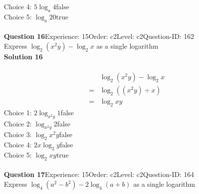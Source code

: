 \documentclass{article}
\begin{document}
Choice 4: \hspace{20pt}$5\log_{a}4$\hspace{20pt}false\\
Choice 5: \hspace{20pt}$\log_{a}20$\hspace{20pt}true\\
\\[4pt]
\noindent\textbf{Question 16}\hspace{20pt}Experience: 15\hspace{20pt}Order: c2\hspace{20pt}Level: c2\hspace{20pt}Question-ID: 162\\[2pt]
Express $\log_{2}(x^2y)-\log_{2}x$ as a single logarithm\\[4pt]
\noindent\textbf{Solution 16}\\[2pt]
\\[-35pt]\begin{align*}
&\log_{2}(x^2y)-\log_{2}x\\[2pt]
=&\log_{2}((x^2y) \div x)\\[2pt]
=&\log_{2}xy
\end{align*}
Choice 1: \hspace{20pt}$2\log_{x^2y}1$\hspace{20pt}false\\
Choice 2: \hspace{20pt}$\log_{x^2y}2$\hspace{20pt}false\\
Choice 3: \hspace{20pt}$\log_{2}x^2y$\hspace{20pt}false\\
Choice 4: \hspace{20pt}$2x\log_{2}y$\hspace{20pt}false\\
Choice 5: \hspace{20pt}$\log_{2}xy$\hspace{20pt}true\\
\\[4pt]
\noindent\textbf{Question 17}\hspace{20pt}Experience: 15\hspace{20pt}Order: c2\hspace{20pt}Level: c2\hspace{20pt}Question-ID: 164\\[2pt]
Express $\log_{4}(a^2-b^2)-2\log_{4}(a+b)$ as a single logarithm\\[4pt]
\end{document}

